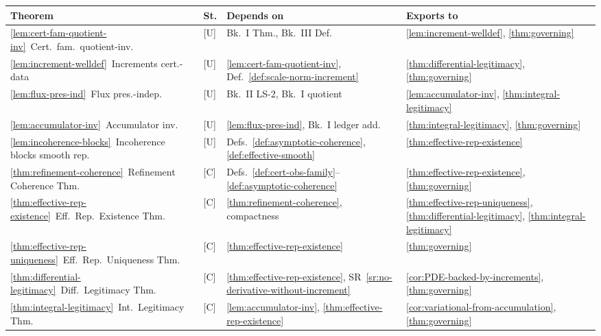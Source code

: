 \documentclass[12pt,oneside]{amsbook}
\theoremstyle{plain}
\theoremstyle{definition}
\theoremstyle{remark}
\begin{document}
\renewcommand{\arraystretch}{1.4}
\noindent
\begin{tabular}{@{}p{4.2cm}p{0.8cm}p{3.4cm}p{4.6cm}@{}}
\hline
\textbf{Theorem} & \textbf{St.} & \textbf{Depends on} & \textbf{Exports to} \\
\hline
\ref{lem:cert-fam-quotient-inv}\ Cert.\ fam.\ quotient-inv.
  & [U] & Bk.~I Thm., Bk.~III Def.
  & \ref{lem:increment-welldef}, \ref{thm:governing} \\

\ref{lem:increment-welldef}\ Increments cert.-data
  & [U] & \ref{lem:cert-fam-quotient-inv}, Def.~\ref{def:scale-norm-increment}
  & \ref{thm:differential-legitimacy}, \ref{thm:governing} \\

\ref{lem:flux-pres-ind}\ Flux pres.-indep.
  & [U] & Bk.~II LS-2, Bk.~I quotient
  & \ref{lem:accumulator-inv}, \ref{thm:integral-legitimacy} \\

\ref{lem:accumulator-inv}\ Accumulator inv.
  & [U] & \ref{lem:flux-pres-ind}, Bk.~I ledger add.
  & \ref{thm:integral-legitimacy}, \ref{thm:governing} \\

\ref{lem:incoherence-blocks}\ Incoherence blocks smooth rep.
  & [U] & Defs.~\ref{def:asymptotic-coherence}, \ref{def:effective-smooth}
  & \ref{thm:effective-rep-existence} \\

\ref{thm:refinement-coherence}\ Refinement Coherence Thm.
  & [C] & Defs.~\ref{def:cert-obs-family}--\ref{def:asymptotic-coherence}
  & \ref{thm:effective-rep-existence}, \ref{thm:governing} \\

\ref{thm:effective-rep-existence}\ Eff.\ Rep.\ Existence Thm.
  & [C] & \ref{thm:refinement-coherence}, compactness
  & \ref{thm:effective-rep-uniqueness}, \ref{thm:differential-legitimacy},
    \ref{thm:integral-legitimacy} \\

\ref{thm:effective-rep-uniqueness}\ Eff.\ Rep.\ Uniqueness Thm.
  & [C] & \ref{thm:effective-rep-existence}
  & \ref{thm:governing} \\

\ref{thm:differential-legitimacy}\ Diff.\ Legitimacy Thm.
  & [C] & \ref{thm:effective-rep-existence}, SR~\ref{sr:no-derivative-without-increment}
  & \ref{cor:PDE-backed-by-increments}, \ref{thm:governing} \\

\ref{thm:integral-legitimacy}\ Int.\ Legitimacy Thm.
  & [C] & \ref{lem:accumulator-inv}, \ref{thm:effective-rep-existence}
  & \ref{cor:variational-from-accumulation}, \ref{thm:governing} \\


\end{tabular}
\end{document}

